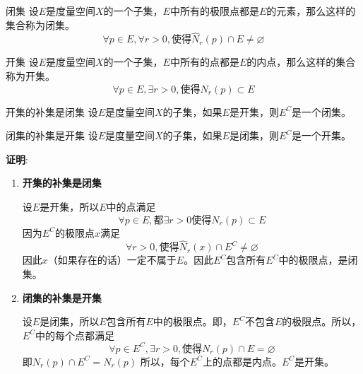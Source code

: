 \begin{definition}{闭集}
设$E$是度量空间$X$的一个子集，$E$中所有的极限点都是$E$的元素，那么这样的集合称为闭集。
\begin{equation}
\forall{p\in{E}},\forall{r>0},\text{使得}\hat{N}_r(p)\cap{E}\not=\varnothing
\end{equation}
\end{definition}

\begin{definition}{开集}
设$E$是度量空间$X$的一个子集，$E$中所有的点都是$E$的内点，那么这样的集合称为开集。
\begin{equation}
\forall{p\in{E}},\exists{r>0},\text{使得}N_r(p)\subset{E}
\end{equation}
\end{definition}

\begin{theorem}{开集的补集是闭集}
设$E$是度量空间$X$的子集，如果$E$是开集，则$E^C$是一个闭集。
\end{theorem}

\begin{corollary}{闭集的补集是开集}
设$E$是度量空间$X$的子集，如果$E$是闭集，则$E^C$是一个开集。
\end{corollary}


\textbf{证明}:
\begin{enumerate}
\item \textbf{开集的补集是闭集}

设$E$是开集，所以$E$中的点满足
\begin{equation}
\forall{p\in{E}},\text{都}\exists{r}>0\text{使得}N_r(p)\subset{E}
\end{equation}
因为$E^C$的极限点$x$满足
\begin{equation}
\forall{r}>0,\text{使得}\hat{N}_r(x)\cap{E^C}\not=\varnothing
\end{equation}
因此$x$（如果存在的话）一定不属于$E$。因此$E^C$包含所有$E^C$中的极限点，是闭集。


\item \textbf{闭集的补集是开集}

设$E$是闭集，所以$E$包含所有$E$中的极限点。即，$E^C$不包含$E$的极限点。所以，$E^C$中的每个点都满足
\begin{equation}
\forall{p}\in{E^C},\exists{r>0},\text{使得}N_r(p)\cap{E}=\varnothing
\end{equation}
即$N_r(p)\cap{E^C}=N_r(p)$
所以，每个$E^C$上的点都是内点。$E^C$是开集。
\end{enumerate}

